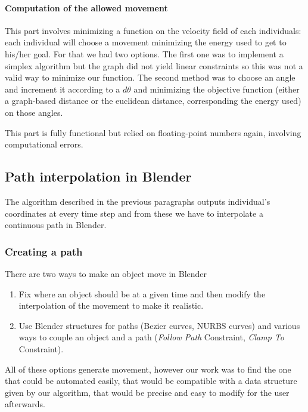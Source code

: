 \paragraph{Computation of the allowed movement}

This part involves minimizing a function on the velocity field of each
individuals: each individual will choose a movement minimizing the
energy used to get to his/her goal. For that we had two options. The
first one was to implement a simplex algorithm but the graph did not
yield linear constraints so this was not a valid way to minimize our
function. The second method was to choose an angle and increment it
according to a $d\theta$ and minimizing the objective function (either
a graph-based distance or the euclidean distance, corresponding the
energy used) on those angles.


This part is fully functional but relied on floating-point numbers
again, involving computational errors.


\subsection{Path interpolation in Blender}

The algorithm described in the previous paragraphs outputs
individual's coordinates at every time step and from these we have to
interpolate a continuous path in Blender.


\subsubsection{Creating a path}

There are two ways to make an object move in Blender
\begin{enumerate}
\item Fix where an object should be at a given time and then modify
the interpolation of the movement to make it realistic.
\item Use Blender structures for paths (Bezier curves, NURBS curves)
and various ways to couple an object and a path (\textit{Follow Path}
Constraint, \textit{Clamp To} Constraint).
\end{enumerate}

All of these options generate movement, however our work was to find
the one that could be automated easily, that would be compatible with
a data structure given by our algorithm, that would be precise and
easy to modify for the user afterwards.

